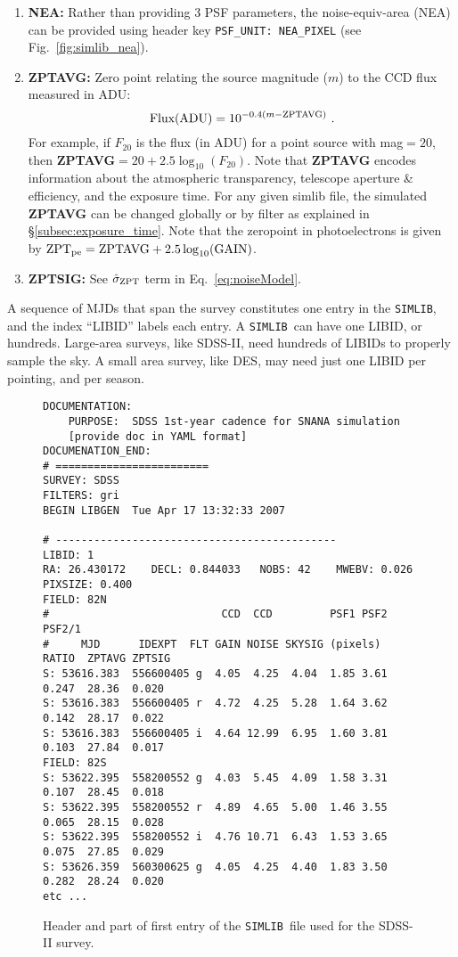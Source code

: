 \documentclass[12pt]{article}
\newcommand{\simlib}{{\tt SIMLIB}}
\newcommand{\sigZPT}{\hat\sigma_{\rm ZPT}}
\newcommand{\ZPTpe}{{\rm ZPT}_{\rm pe}}
\begin{document}
{\begin{enumerate}
	then you can simply define 
	${\rm PSF1} = \sqrt{A/4\pi}$ and set {\bf PSF2}={\bf RATIO}=0.
%
  \item {\bf NEA:} Rather than providing 3 PSF parameters, the noise-equiv-area
       (NEA) can be provided using header key {\tt PSF\_UNIT: NEA\_PIXEL}
       (see Fig.~\ref{fig:simlib_nea}).
%
  \item {\bf ZPTAVG:} Zero point relating the source magnitude ($m$) 
    to the CCD flux measured in ADU: 
       $$ {\rm Flux(ADU)} = 10^{-0.4(m-{\rm ZPTAVG})}~.  $$
    For example, if $F_{20}$ is the flux (in ADU) for a point source
    with mag$=20$, then {\bf ZPTAVG}$= 20 + 2.5\log_{10}(F_{20})$.
    Note that {\bf ZPTAVG} encodes information about the 
    atmospheric transparency, telescope aperture \& efficiency,
    and the exposure time. 
    For any given simlib file, the simulated {\bf ZPTAVG} can be changed
    globally or by filter as explained in \S\ref{subsec:exposure_time}.
    Note that the zeropoint in photoelectrons is given by
    $\ZPTpe = {\rm ZPTAVG} + 2.5\log_{10}({\rm GAIN})$.
%
  \item {\bf ZPTSIG:} See $\sigZPT$ term in Eq.~\ref{eq:noiseModel}.
\end{enumerate}


A sequence of MJDs that span the survey constitutes one entry
in the {\simlib}, and the index ``LIBID'' labels each entry.
A \simlib\ can have one LIBID, or hundreds. Large-area surveys,
like SDSS-II, need hundreds of LIBIDs to properly sample the sky.
A small area survey, like DES, may need just one LIBID per pointing,
and per season.


\begin{figure} [ht] 
\begin{center}
\begin{Verbatim}[frame=single]
DOCUMENTATION:
    PURPOSE:  SDSS 1st-year cadence for SNANA simulation
    [provide doc in YAML format]
DOCUMENATION_END:
# ========================
SURVEY: SDSS     
FILTERS: gri 
BEGIN LIBGEN  Tue Apr 17 13:32:33 2007
 
# -------------------------------------------- 
LIBID: 1 
RA: 26.430172    DECL: 0.844033   NOBS: 42    MWEBV: 0.026   PIXSIZE: 0.400 
FIELD: 82N
#                           CCD  CCD         PSF1 PSF2 PSF2/1                    
#     MJD      IDEXPT  FLT GAIN NOISE SKYSIG (pixels)  RATIO  ZPTAVG ZPTSIG
S: 53616.383  556600405 g  4.05  4.25  4.04  1.85 3.61 0.247  28.36  0.020 
S: 53616.383  556600405 r  4.72  4.25  5.28  1.64 3.62 0.142  28.17  0.022 
S: 53616.383  556600405 i  4.64 12.99  6.95  1.60 3.81 0.103  27.84  0.017 
FIELD: 82S
S: 53622.395  558200552 g  4.03  5.45  4.09  1.58 3.31 0.107  28.45  0.018 
S: 53622.395  558200552 r  4.89  4.65  5.00  1.46 3.55 0.065  28.15  0.028 
S: 53622.395  558200552 i  4.76 10.71  6.43  1.53 3.65 0.075  27.85  0.029 
S: 53626.359  560300625 g  4.05  4.25  4.40  1.83 3.50 0.282  28.24  0.020 
etc ...
\end{Verbatim}
\end{center}
\caption{
  Header and part of first entry of the \simlib\ file used for
  the SDSS-II survey.
 }
\label{fig:simlib}
\end{figure}


}
\end{document}
